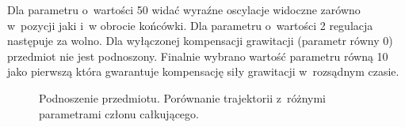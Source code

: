 Dla parametru o~wartości 50 widać wyraźne oscylacje widoczne zarówno w~pozycji jaki i~w obrocie końcówki. Dla parametru o~wartości 2 regulacja następuje za wolno. Dla wyłączonej kompensacji grawitacji (parametr równy 0) przedmiot nie jest podnoszony. Finalnie wybrano wartość parametru równą 10 jako pierwszą która gwarantuje kompensację siły grawitacji w~rozsądnym czasie. 

\begin{figure}[H]
	\centering
	\hfill

	\caption{Podnoszenie przedmiotu. Porównanie trajektorii z~różnymi parametrami członu całkującego.}
	\label{fig:param_a}
	
\end{figure}


